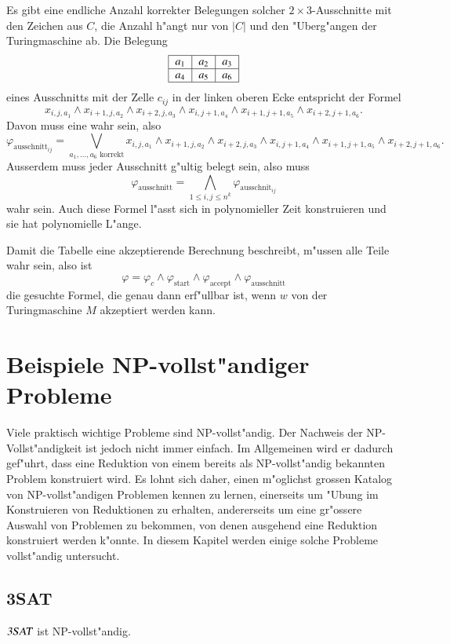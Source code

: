 Es gibt eine endliche Anzahl korrekter Belegungen solcher
$2\times 3$-Ausschnitte mit den Zeichen aus $C$, die Anzahl
h"angt nur von $|C|$ und den "Uberg"angen der Turingmaschine ab.
Die Belegung
\[
\begin{tabular}{|c|c|c|}
\hline
$a_1$&$a_2$&$a_3$\\
\hline
$a_4$&$a_5$&$a_6$\\
\hline
\end{tabular}
\]
eines Ausschnitts mit der Zelle $c_{ij}$ in der
linken oberen Ecke entspricht der Formel
\[
x_{i,j,a_1}\wedge
x_{i+1,j,a_2}\wedge
x_{i+2,j,a_3}\wedge
x_{i,j+1,a_4}\wedge
x_{i+1,j+1,a_5}\wedge
x_{i+2,j+1,a_6}.
\]
Davon muss eine wahr sein, also
\[
\varphi_{\text{ausschnitt}_{ij}}
=
\bigvee_{\text{$a_1,\dots,a_6$ korrekt}}
x_{i,j,a_1}\wedge
x_{i+1,j,a_2}\wedge
x_{i+2,j,a_3}\wedge
x_{i,j+1,a_4}\wedge
x_{i+1,j+1,a_5}\wedge
x_{i+2,j+1,a_6}.
\]
Ausserdem muss jeder Ausschnitt g"ultig belegt sein, also
muss
\[
\varphi_{\text{ausschnitt}} =\bigwedge_{1\le i,j\le n^k}\varphi_{\text{ausschnit}_{ij}}
\]
wahr sein. Auch diese Formel l"asst sich in polynomieller Zeit konstruieren
und sie hat polynomielle L"ange.

Damit die Tabelle eine akzeptierende Berechnung beschreibt, m"ussen
alle Teile wahr sein, also ist
\[
\varphi =
\varphi_{c}\wedge
\varphi_{\text{start}}\wedge
\varphi_{\text{accept}}\wedge
\varphi_{\text{ausschnitt}}
\]
die gesuchte Formel, die genau dann erf"ullbar ist, wenn $w$ von der
Turingmaschine $M$ akzeptiert werden kann.

\section{Beispiele NP-vollst"andiger Probleme}
Viele praktisch wichtige Probleme sind NP-vollst"andig. Der Nachweis
der NP-Vollst"andigkeit ist jedoch nicht immer einfach. Im Allgemeinen
wird er dadurch gef"uhrt, dass eine Reduktion von einem bereits als
NP-vollst"andig bekannten Problem konstruiert wird. Es lohnt sich
daher, einen m"oglichst grossen Katalog von NP-vollst"andigen
Problemen kennen zu lernen, einerseits um "Ubung im Konstruieren
von Reduktionen zu erhalten, andererseits um eine gr"ossere Auswahl 
von Problemen zu bekommen, von denen ausgehend eine Reduktion 
konstruiert werden k"onnte. In diesem Kapitel werden einige
solche Probleme vollst"andig untersucht.
\subsection{3SAT}
\begin{satz}
$\text{\textsl{3SAT}}$ ist NP-vollst"andig.
\end{satz}

